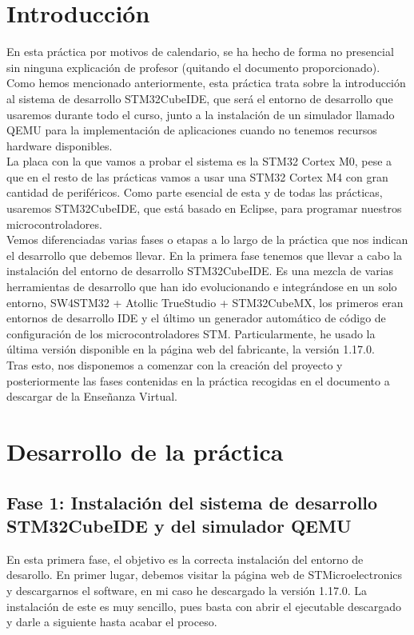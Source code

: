 \documentclass[11pt,a4paper]{article}
\begin{document}
	\section{Introducción}
	\large{
		En esta práctica por motivos de calendario, se ha hecho de forma no presencial sin ninguna explicación de profesor (quitando el documento proporcionado). Como hemos mencionado anteriormente, esta práctica trata sobre la introducción al sistema de desarrollo STM32CubeIDE, que será el entorno de desarrollo que usaremos durante todo el curso, junto a la instalación de un simulador llamado QEMU para la implementación de aplicaciones cuando no tenemos recursos hardware disponibles.\\

		La placa con la que vamos a probar el sistema es la STM32 Cortex M0, pese a que en el resto de las prácticas vamos a usar una STM32 Cortex M4 con gran cantidad de periféricos. Como parte esencial de esta y de todas las prácticas, usaremos STM32CubeIDE, que está basado en Eclipse, para programar nuestros microcontroladores.\\
		
		Vemos diferenciadas varias fases o etapas a lo largo de la práctica que nos indican el desarrollo que debemos llevar. En la primera fase tenemos que llevar a cabo la instalación del entorno de desarrollo STM32CubeIDE. Es una mezcla de varias herramientas de desarrollo que han ido evolucionando e integrándose
		en un solo entorno, SW4STM32 + Atollic TrueStudio + STM32CubeMX, los primeros eran entornos de desarrollo IDE
		y el último un generador automático de código de configuración de los microcontroladores STM. Particularmente, he usado la última versión disponible en la página web del fabricante, la versión 1.17.0.\\

		Tras esto, nos disponemos a comenzar con la creación del proyecto y posteriormente las fases contenidas en la práctica recogidas en el documento a descargar de la Enseñanza Virtual.
	}
	
	\section{Desarrollo de la práctica}
	\subsection{Fase 1: Instalación del sistema de desarrollo STM32CubeIDE y del simulador QEMU}
	En esta primera fase, el objetivo es la correcta instalación del entorno de desarollo. En primer lugar, debemos visitar la página web de STMicroelectronics y descargarnos el software, en mi caso he descargado la versión 1.17.0. La instalación de este es muy sencillo, pues basta con abrir el ejecutable descargado y darle a siguiente hasta acabar el proceso.\\
	
\end{document}
